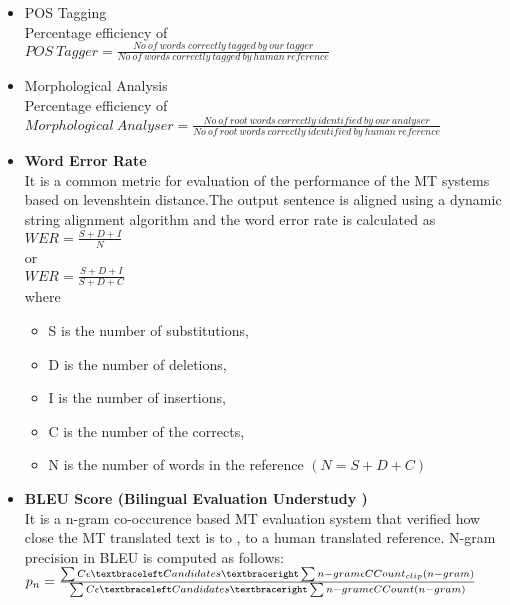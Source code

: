 \documentclass{article}
\begin{document}
\begin{itemize}
\item POS Tagging\\
Percentage efficiency of\\ $POS\ Tagger =\frac {No\ of\ words\ correctly\ tagged\ by\ our\ tagger} {No\ of\ words\ correctly\ tagged\ by\ human\ reference}$\\
\item Morphological Analysis\\
Percentage efficiency of\\ $Morphological\ Analyser =\frac {No\ of\ root\ words\ correctly\ identified\ by\ our\ analyser} {No\ of\ root\ words\ correctly\ identified\ by\ human\ reference}$\\
\item \textbf{Word Error Rate}\\
It is a common metric for evaluation of the performance of the MT systems based on levenshtein distance.The output sentence is aligned using a dynamic string alignment algorithm and the word error rate is calculated as \\
$ WER = \frac { S + D + I }{ N } $ \\
or\\
$ WER = \frac { S + D + I }{ S + D + C } $ \\
where
\begin {itemize}
\item S is 	the number of substitutions, 
\item D is 	the number of deletions,
\item I is 	the number of insertions,
\item C is 	the number of the corrects,
\item N is 	the number of words in the reference $(N=S+D+C)$\\
\end {itemize}

\item \textbf{BLEU Score (Bilingual Evaluation Understudy )}\\
It is a n-gram co-occurence based MT evaluation system that verified how close the MT translated text is to , to a human translated reference.
N-gram precision in BLEU is computed as follows:\\

$p_{n} = \frac { \sum { C  \epsilon \textbraceleft Candidates \textbraceright }{} \sum{n-gram \epsilon C }{ Count _ {clip} (  n - gram )} }{ \sum{C  \epsilon \textbraceleft Candidates \textbraceright } \sum{n-gram \epsilon C }{} Count (  n - gram ) }$\\


\end{itemize}
\end{document}

